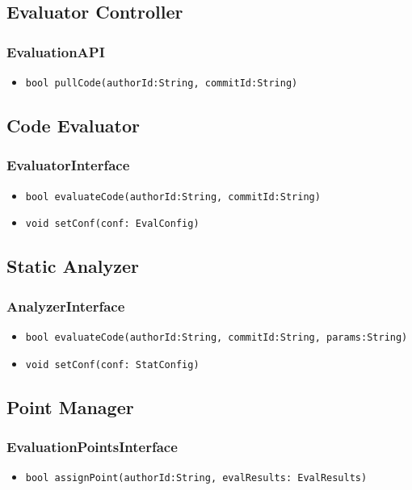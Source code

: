 \subsection{Evaluator Controller}
\subsubsection{EvaluationAPI}
\begin{itemize}
    \item \texttt{bool pullCode(authorId:String, commitId:String)}
\end{itemize}

\subsection{Code Evaluator}
\subsubsection{EvaluatorInterface}
\begin{itemize}
    \item \texttt{bool evaluateCode(authorId:String, commitId:String)}
    \item \texttt{void setConf(conf: EvalConfig)}
\end{itemize}

\subsection{Static Analyzer}
\subsubsection{AnalyzerInterface}
\begin{itemize}
    \item \texttt{bool evaluateCode(authorId:String, commitId:String, params:String)}
    \item \texttt{void setConf(conf: StatConfig)}
\end{itemize}

\subsection{Point Manager}
\subsubsection{EvaluationPointsInterface}
\begin{itemize}
    \item \texttt{bool assignPoint(authorId:String, evalResults: EvalResults)}
\end{itemize}

